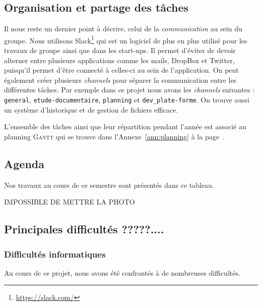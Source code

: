 \subsection{Organisation et partage des tâches}
Il nous reste un dernier point à décrire, celui de la \emph{communication}
au sein du groupe.
Nous utilisons Slack\footnote{\url{https://slack.com/}} qui est un logiciel
de plus en plus utilisé pour les travaux de groupe ainsi que dans les start-ups.
Il permet d'éviter de devoir alterner entre plusieurs applications comme les mails,
DropBox et Twitter, puisqu'il permet d'être connecté
à celles-ci au sein de l'application.
On peut également créer plusieurs \emph{channels} pour séparer la communication
entre les différentes tâches.
Par exemple dans ce projet nous avons les \emph{channels} suivantes :
\texttt{general}, \texttt{etude-documentaire}, 
\texttt{planning} et \texttt{dev\_plate-forme}.
On trouve aussi un système d'historique et de gestion de fichiers efficace.

L'ensemble des tâches ainsi que leur répartition pendant l'année
est associé au planning \textsc{Gantt} qui se trouve
dans l'Annexe~\ref{ann:planning} à la page~\pageref{ann:planning}.

\subsection{Agenda}

Nos travaux au cours de ce semestre sont présentés dans ce tableau.

IMPOSSIBLE DE METTRE LA PHOTO


\subsection{Principales difficultés ?????....}


\subsubsection{Difficultés informatiques}

Au cours de ce projet, nous avons été confrontés à de nombreuses difficultés.

